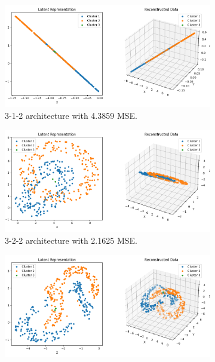 \begin{figure}[htb]
  \centering
  \begin{subfigure}[b]{0.49\textwidth}
    \centering
    \includegraphics[width=\linewidth]{images/RQ1/3-1-2_4.3859.png}
    \caption{3-1-2 architecture with \textcolor{red!100!black}{4.3859} MSE.}
    \label{fig:3-1-2}
  \end{subfigure}
  \hfill
  \begin{subfigure}[b]{0.49\textwidth}
    \centering
    \includegraphics[width=\linewidth]{images/RQ1/3-2-2_2.1625.png}
    \caption{3-2-2 architecture with \textcolor{red!60!black}{2.1625} MSE.}
    \label{fig:3-2-2}
  \end{subfigure}
  \hfill
  \begin{subfigure}[b]{0.49\textwidth}
    \centering
    \includegraphics[width=\linewidth]{images/RQ1/3-4-2_0.5070.png}

\end{subfigure}
\end{figure}
